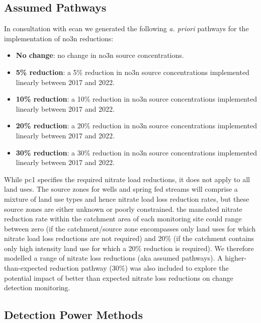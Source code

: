 \subsection[Pathways]{Assumed Pathways} \label{subsec:apriori}

In consultation with \gls{ecan} we generated the following \textit{a. priori} pathways for the implementation of \gls{no3n} reductions:
\begin{itemize}
    \item \textbf{No change}: no change in \gls{no3n} source concentrations.
    \item \textbf{5\% reduction}: a 5\% reduction in \gls{no3n} source concentrations implemented linearly between 2017 and 2022.
    \item \textbf{10\% reduction}: a 10\% reduction in \gls{no3n} source concentrations implemented linearly between 2017 and 2022.
    \item \textbf{20\% reduction}: a 20\% reduction in \gls{no3n} source concentrations implemented linearly between 2017 and 2022.
    \item \textbf{30\% reduction}: a 30\% reduction in \gls{no3n} source concentrations implemented linearly between 2017 and 2022.
\end{itemize}

While \gls{pc1} specifies the required nitrate load reductions, it does not apply to all land uses.
The source zones for wells and spring fed streams will comprise a mixture of land use types and hence nitrate load loss reduction rates, but these source zones are either unknown or poorly constrained.
the mandated nitrate reduction rate within the catchment area of each monitoring site could range between zero (if the catchment/source zone encompasses only land uses for which nitrate load loss reductions are not required) and 20\% (if the catchment contains only high intensity land use for which a 20\% reduction is required).
We therefore modelled a range of nitrate loss reductions (aka assumed pathways).
A higher-than-expected reduction pathway (30\%) was also included to explore the potential impact of better than expected nitrate loss reductions on change detection monitoring.

\subsection[Detection Power Methods] {Detection Power Methods} \label{subsec:detection_power_methods}

